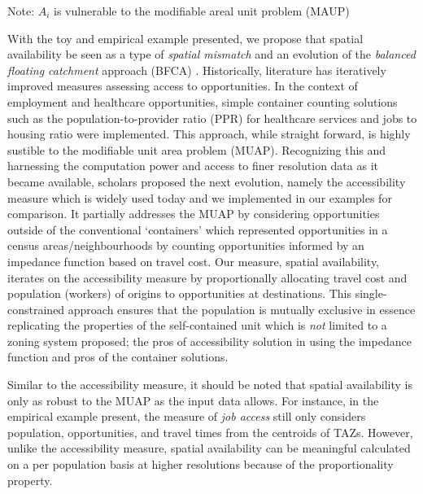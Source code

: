 \documentclass[]{elsarticle} %
\begin{document}
Note: \(A_i\) is vulnerable to the modifiable areal unit problem (MAUP)

With the toy and empirical example presented, we propose that spatial
availability be seen as a type of \emph{spatial mismatch} and an
evolution of the \emph{balanced floating catchment} approach (BFCA) .
Historically, literature has iteratively improved measures assessing
access to opportunities. In the context of employment and healthcare
opportunities, simple container counting solutions such as the
population-to-provider ratio (PPR) for healthcare services and jobs to
housing ratio were implemented. This approach, while straight forward,
is highly sustible to the modifiable unit area problem (MUAP).
Recognizing this and harnessing the computation power and access to
finer resolution data as it became available, scholars proposed the next
evolution, namely the accessibility measure which is widely used today
and we implemented in our examples for comparison. It partially
addresses the MUAP by considering opportunities outside of the
conventional `containers' which represented opportunities in a census
areas/neighbourhoods by counting opportunities informed by an impedance
function based on travel cost. Our measure, spatial availability,
iterates on the accessibility measure by proportionally allocating
travel cost and population (workers) of origins to opportunities at
destinations. This single-constrained approach ensures that the
population is mutually exclusive in essence replicating the properties
of the self-contained unit which is \emph{not} limited to a zoning
system proposed; the pros of accessibility solution in using the
impedance function and pros of the container solutions.

Similar to the accessibility measure, it should be noted that spatial
availability is only as robust to the MUAP as the input data allows. For
instance, in the empirical example present, the measure of \emph{job
access} still only considers population, opportunities, and travel times
from the centroids of TAZs. However, unlike the accessibility measure,
spatial availability can be meaningful calculated on a per population
basis at higher resolutions because of the proportionality property.
\end{document}
